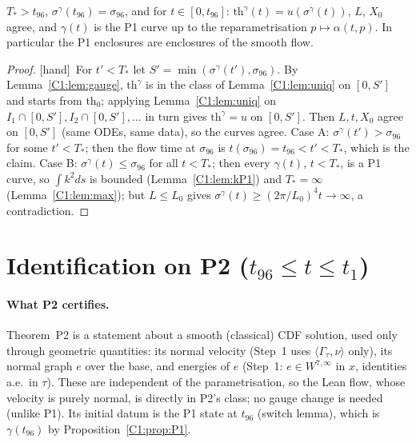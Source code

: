 \documentclass[11pt]{article}
\newcommand{\tH}{\textup{[hand]}}\newcommand{\tS}{\textup{[sym]}}\newcommand{\tC}{\textup{[cert]}}\newcommand{\tI}{\textup{[cited]}}\newcommand{\tN}{\textup{[num]}}
\newcommand{\ip}[2]{\langle#1,#2\rangle}
\begin{document}
\begin{proposition}[identification on P1]\label{C1:prop:P1}
$T_*>t_{96}$, $\sigma^\gamma(t_{96})=\sigma_{96}$, and for $t\in[0,t_{96}]$: $\mathrm{th}^\gamma(t)=u(\sigma^\gamma(t))$, $L$, $X_0$ agree, and $\gamma(t)$ is the P1 curve up to the reparametrisation $p\mapsto\alpha(t,p)$. In particular the P1 enclosures are enclosures of the smooth flow.
\end{proposition}
\begin{proof}\tH\ For $t'<T_*$ let $S'=\min(\sigma^\gamma(t'),\sigma_{96})$. By Lemma~\ref{C1:lem:gauge}, $\mathrm{th}^\gamma$ is in the class of Lemma~\ref{C1:lem:uniq} on $[0,S']$ and starts from $\mathrm{th}_0$; applying Lemma~\ref{C1:lem:uniq} on $I_1\cap[0,S'],I_2\cap[0,S'],\dots$ in turn gives $\mathrm{th}^\gamma=u$ on $[0,S']$. Then $L,t,X_0$ agree on $[0,S']$ (same ODEs, same data), so the curves agree. Case A: $\sigma^\gamma(t')>\sigma_{96}$ for some $t'<T_*$; then the flow time at $\sigma_{96}$ is $t(\sigma_{96})=t_{96}<t'<T_*$, which is the claim. Case B: $\sigma^\gamma(t)\le\sigma_{96}$ for all $t<T_*$; then every $\gamma(t)$, $t<T_*$, is a P1 curve, so $\int k^2ds$ is bounded (Lemma~\ref{C1:lem:kP1}) and $T_*=\infty$ (Lemma~\ref{C1:lem:max}); but $L\le L_0$ gives $\sigma^\gamma(t)\ge(2\pi/L_0)^4t\to\infty$, a contradiction.
\end{proof}

\section{Identification on P2 ($t_{96}\le t\le t_1$)}
\paragraph{What P2 certifies.} Theorem~P2 is a statement about a smooth (classical) CDF solution, used only through geometric quantities: its normal velocity (Step~1 uses $\ip{\Gamma_\tau}{\nu}$ only), its normal graph $e$ over the base, and energies of $e$ (Step~1: $e\in W^{7,\infty}$ in $x$, identities a.e.\ in $\tau$). These are independent of the parametrisation, so the Lean flow, whose velocity is purely normal, is directly in P2's class; no gauge change is needed (unlike P1). Its initial datum is the P1 state at $t_{96}$ (switch lemma), which is $\gamma(t_{96})$ by Proposition~\ref{C1:prop:P1}.
\end{document}
